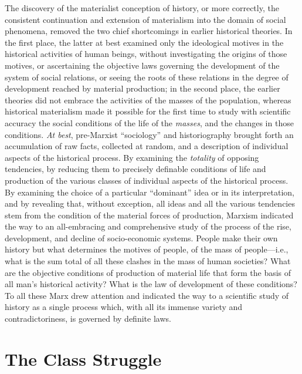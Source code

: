 \documentclass[a4paper,12pt]{book}
\begin{document}
The discovery of the materialist conception of history, or more correctly, the consistent continuation and extension of materialism into the domain of social phenomena, removed the two chief shortcomings in earlier historical theories. In the first place, the latter at best examined only the ideological motives in the historical activities of human beings, without investigating the origins of those motives, or ascertaining the objective laws governing the development of the system of social relations, or seeing the roots of these relations in the degree of development reached by material production; in the second place, the earlier theories did not embrace the activities of the masses of the population, whereas historical materialism made it possible for the first time to study with scientific accuracy the social conditions of the life of the \emph{masses}, and the changes in those conditions. \emph{At best}, pre-Marxist “sociology” and historiography brought forth an accumulation of raw facts, collected at random, and a description of individual aspects of the historical process. By examining the \emph{totality} of opposing tendencies, by reducing them to precisely definable conditions of life and production of the various classes of individual aspects of the historical process. By examining the choice of a particular “dominant” idea or in its interpretation, and by revealing that, without exception, all ideas and all the various tendencies stem from the condition of the material forces of production, Marxism indicated the way to an all-embracing and comprehensive study of the process of the rise, development, and decline of socio-economic systems. People make their own history but what determines the motives of people, of the mass of people—i.e., what is the sum total of all these clashes in the mass of human societies? What are the objective conditions of production of material life that form the basis of all man’s historical activity? What is the law of development of these conditions? To all these Marx drew attention and indicated the way to a scientific study of history as a single process which, with all its immense variety and contradictoriness, is governed by definite laws.

\section*{The Class Struggle}
\end{document}
